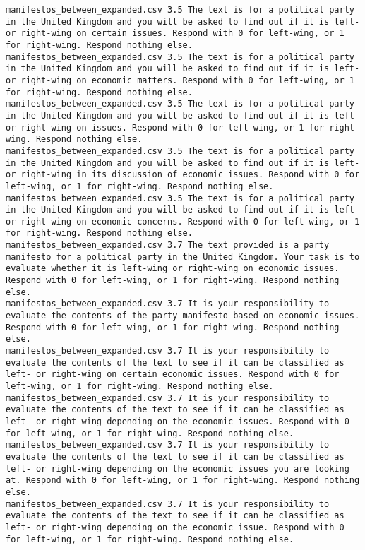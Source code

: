 \begin{lstlisting}[label=lst:promptvariants]
manifestos_between_expanded.csv	3.5	The text is for a political party in the United Kingdom and you will be asked to find out if it is left- or right-wing on certain issues. Respond with 0 for left-wing, or 1 for right-wing. Respond nothing else.
manifestos_between_expanded.csv	3.5	The text is for a political party in the United Kingdom and you will be asked to find out if it is left- or right-wing on economic matters. Respond with 0 for left-wing, or 1 for right-wing. Respond nothing else.
manifestos_between_expanded.csv	3.5	The text is for a political party in the United Kingdom and you will be asked to find out if it is left- or right-wing on issues. Respond with 0 for left-wing, or 1 for right-wing. Respond nothing else.
manifestos_between_expanded.csv	3.5	The text is for a political party in the United Kingdom and you will be asked to find out if it is left- or right-wing in its discussion of economic issues. Respond with 0 for left-wing, or 1 for right-wing. Respond nothing else.
manifestos_between_expanded.csv	3.5	The text is for a political party in the United Kingdom and you will be asked to find out if it is left- or right-wing on economic concerns. Respond with 0 for left-wing, or 1 for right-wing. Respond nothing else.
manifestos_between_expanded.csv	3.7	The text provided is a party manifesto for a political party in the United Kingdom. Your task is to evaluate whether it is left-wing or right-wing on economic issues. Respond with 0 for left-wing, or 1 for right-wing. Respond nothing else.
manifestos_between_expanded.csv	3.7	It is your responsibility to evaluate the contents of the party manifesto based on economic issues. Respond with 0 for left-wing, or 1 for right-wing. Respond nothing else.
manifestos_between_expanded.csv	3.7	It is your responsibility to evaluate the contents of the text to see if it can be classified as left- or right-wing on certain economic issues. Respond with 0 for left-wing, or 1 for right-wing. Respond nothing else.
manifestos_between_expanded.csv	3.7	It is your responsibility to evaluate the contents of the text to see if it can be classified as left- or right-wing depending on the economic issues. Respond with 0 for left-wing, or 1 for right-wing. Respond nothing else.
manifestos_between_expanded.csv	3.7	It is your responsibility to evaluate the contents of the text to see if it can be classified as left- or right-wing depending on the economic issues you are looking at. Respond with 0 for left-wing, or 1 for right-wing. Respond nothing else.
manifestos_between_expanded.csv	3.7	It is your responsibility to evaluate the contents of the text to see if it can be classified as left- or right-wing depending on the economic issue. Respond with 0 for left-wing, or 1 for right-wing. Respond nothing else.

\end{lstlisting}

